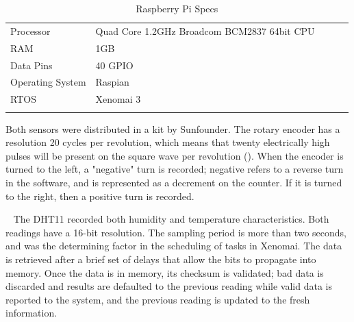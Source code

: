 \documentclass[letterpaper, 12pt]{article}
\begin{document}
\begin{table}[hbt]
	\centering
	\caption{Raspberry Pi Specs}
	\label{my-label}
	\begin{tabular}{lllll}
		\cline{1-2}
		\multicolumn{1}{|l|}{Processor} & \multicolumn{1}{l|}{Quad Core 1.2GHz Broadcom BCM2837 64bit CPU} &  &  &  \\ \cline{1-2}
		\multicolumn{1}{|l|}{RAM} & \multicolumn{1}{l|}{1GB} &  &  &  \\ \cline{1-2}
		\multicolumn{1}{|l|}{Data Pins} & \multicolumn{1}{l|}{40 GPIO} &  &  &  \\ \cline{1-2}
		\multicolumn{1}{|l|}{Operating System} & \multicolumn{1}{l|}{Raspian} &  &  &  \\ \cline{1-2}
		\multicolumn{1}{|l|}{RTOS} & \multicolumn{1}{l|}{Xenomai 3} &  &  &  \\ \cline{1-2}
		&                       &  &  & 
	\end{tabular}
\end{table}

Both sensors were distributed in a kit by Sunfounder.  The rotary encoder has a resolution 20 cycles per revolution, which means that twenty electrically high pulses will be present on the square wave per revolution (\cite{artofcircuits2018}).  When the encoder is turned to the left, a "negative" turn is recorded; negative refers to a reverse turn in the software, and is represented as a decrement on the counter.  If it is turned to the right, then a positive turn is recorded.  

~\newpage
\indent The DHT11 recorded both humidity and temperature characteristics.  Both readings have a 16-bit resolution.  The sampling period is more than two seconds, and was the determining factor in the scheduling of tasks in Xenomai. The data is retrieved after a brief set of delays that allow the bits to propagate into memory.  Once the data is in memory, its checksum is validated; bad data is discarded and results are defaulted to the previous reading while valid data is reported to the system, and the previous reading is updated to the fresh information.
\end{document}
